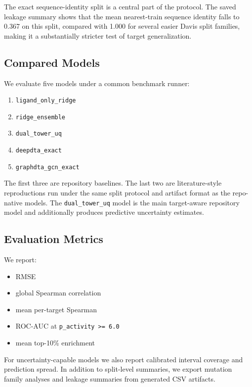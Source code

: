 \documentclass[11pt]{article}
\begin{document}
The exact sequence-identity split is a central part of the protocol. The saved
leakage summary shows that the mean nearest-train sequence identity falls to
0.367 on this split, compared with 1.000 for several easier Davis split
families, making it a substantially stricter test of target generalization.

\subsection{Compared Models}

We evaluate five models under a common benchmark runner:

\begin{enumerate}
  \item \texttt{ligand\_only\_ridge}
  \item \texttt{ridge\_ensemble}
  \item \texttt{dual\_tower\_uq}
  \item \texttt{deepdta\_exact}
  \item \texttt{graphdta\_gcn\_exact}
\end{enumerate}

The first three are repository baselines. The last two are literature-style
reproductions run under the same split protocol and artifact format as the
repo-native models. The \texttt{dual\_tower\_uq} model is the main target-aware
repository model and additionally produces predictive uncertainty estimates.

\subsection{Evaluation Metrics}

We report:

\begin{itemize}
  \item RMSE
  \item global Spearman correlation
  \item mean per-target Spearman
  \item ROC-AUC at \texttt{p\_activity >= 6.0}
  \item mean top-10\% enrichment
\end{itemize}

For uncertainty-capable models we also report calibrated interval coverage and
prediction spread. In addition to split-level summaries, we export mutation
family analyses and leakage summaries from generated CSV artifacts.
\end{document}
